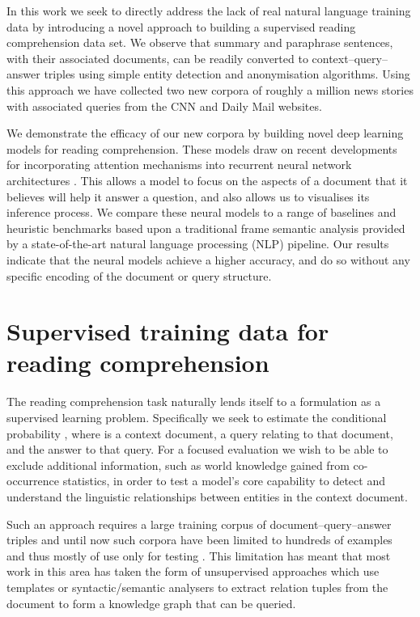 \documentclass{article}
\begin{document}
In this work we seek to directly address the lack of real natural language
training data by introducing a novel approach to building a supervised reading
comprehension data set. We observe that summary and paraphrase sentences, with
their associated documents, can be readily converted to context--query--answer
triples using simple entity detection and anonymisation algorithms.
Using this approach we have collected two new corpora of roughly a million news
stories with associated queries from the CNN and Daily Mail websites.

We demonstrate the efficacy of our new corpora by building novel deep learning
models for reading comprehension. These models draw on recent developments
for incorporating attention mechanisms into recurrent neural network architectures
\cite{Bahdanau:2014:NMT,Mnih:2014:RMVA,Gregor:2015:DRAW,Sukhbaatar:2015}. This allows a model to
focus on the aspects of a document that it believes will help it answer a
question, and also allows us to visualises its inference process.
We compare these neural models to a range of baselines and heuristic benchmarks
based upon a traditional frame semantic analysis provided by a state-of-the-art
natural language processing (NLP) pipeline. Our results indicate that the neural
models achieve a higher accuracy, and do so without any specific encoding of the
document or query structure.
 \section{Supervised training data for reading comprehension}
\label{data}

The reading comprehension task naturally lends itself to a formulation as a
supervised learning problem. Specifically we seek to estimate the conditional
probability , where  is a context document,  a query relating to
that document, and  the answer to that query.
For a focused evaluation we wish to be able to exclude additional information,
such as world knowledge gained from co-occurrence statistics, in order to test a
model's core capability to detect and understand the linguistic relationships
between entities in the context document.

Such an approach requires a large training corpus of document--query--answer
triples and until now such corpora have been limited to hundreds of examples and
thus mostly of use only for testing \cite{Richardson:2013:MCT}. This limitation
has meant that most work in this area has taken the form of unsupervised
approaches which use templates or syntactic/semantic analysers to extract
relation tuples from the document to form a knowledge graph that can be queried.
\end{document}

